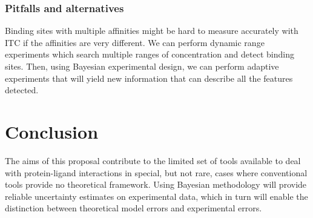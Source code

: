 \documentclass[10pt,final]{article}
\begin{document}
\subsubsection*{Pitfalls and alternatives}
Binding sites with multiple affinities might be hard to measure accurately with ITC if the affinities are very different. We can perform dynamic range experiments which search multiple ranges of concentration and detect binding sites. Then, using Bayesian experimental design, we can perform adaptive experiments that will yield new information that can describe all the features detected.


\section*{Conclusion}
The aims of this proposal contribute to the limited set of tools available to deal with protein-ligand interactions in special, but not rare, cases where conventional tools provide no theoretical framework. Using Bayesian methodology will provide reliable uncertainty estimates on experimental data, which in turn will enable the distinction between theoretical model errors and experimental errors.

\printbibliography
\end{document}
